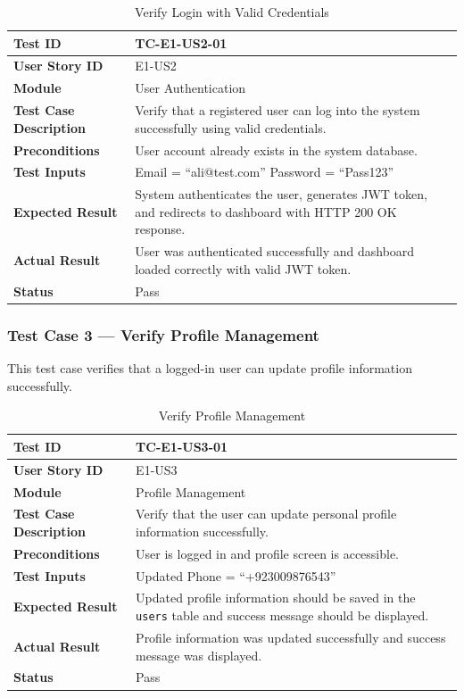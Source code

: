 \begin{longtable}{|p{4cm}|p{8cm}|}
\caption{Verify Login with Valid Credentials}
\label{tab:tc_login} \\
\hline
\textbf{Test ID} & TC-E1-US2-01 \\ \hline
\textbf{User Story ID} & E1-US2 \\ \hline
\textbf{Module} & User Authentication \\ \hline
\textbf{Test Case Description} & Verify that a registered user can 
log into the system successfully using valid credentials. \\ \hline
\textbf{Preconditions} & User account already exists in the system 
database. \\ \hline
\textbf{Test Inputs} &
Email = ``ali@test.com'' \newline
Password = ``Pass123'' \\ \hline
\textbf{Expected Result} & System authenticates the user, generates 
JWT token, and redirects to dashboard with HTTP 200 OK response. 
\\ \hline
\textbf{Actual Result} & User was authenticated successfully and 
dashboard loaded correctly with valid JWT token. \\ \hline
\textbf{Status} & Pass \\ \hline
\end{longtable}

\subsubsection{Test Case 3 --- Verify Profile Management}

This test case verifies that a logged-in user can update profile 
information successfully.

\begin{longtable}{|p{4cm}|p{8cm}|}
\caption{Verify Profile Management}
\label{tab:tc_profile} \\
\hline
\textbf{Test ID} & TC-E1-US3-01 \\ \hline
\textbf{User Story ID} & E1-US3 \\ \hline
\textbf{Module} & Profile Management \\ \hline
\textbf{Test Case Description} & Verify that the user can update 
personal profile information successfully. \\ \hline
\textbf{Preconditions} & User is logged in and profile screen is 
accessible. \\ \hline
\textbf{Test Inputs} &
Updated Phone = ``+923009876543'' \\ \hline
\textbf{Expected Result} & Updated profile information should be 
saved in the \texttt{users} table and success message should be 
displayed. \\ \hline
\textbf{Actual Result} & Profile information was updated successfully 
and success message was displayed. \\ \hline
\textbf{Status} & Pass \\ \hline
\end{longtable}


